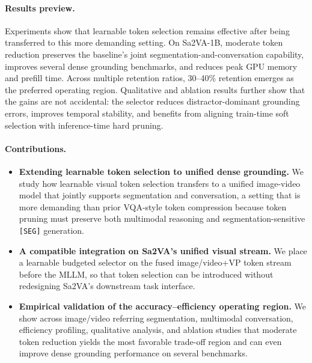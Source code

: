 \paragraph{Results preview.}
Experiments show that learnable token selection remains effective after being transferred to this more demanding setting.
On Sa2VA-1B, moderate token reduction preserves the baseline's joint segmentation-and-conversation capability, improves several dense grounding benchmarks, and reduces peak GPU memory and prefill time.
Across multiple retention ratios, 30--40\% retention emerges as the preferred operating region.
Qualitative and ablation results further show that the gains are not accidental: the selector reduces distractor-dominant grounding errors, improves temporal stability, and benefits from aligning train-time soft selection with inference-time hard pruning.

\paragraph{Contributions.}
\begin{itemize}
    \item \textbf{Extending learnable token selection to unified dense grounding.} We study how learnable visual token selection transfers to a unified image-video model that jointly supports segmentation and conversation, a setting that is more demanding than prior VQA-style token compression because token pruning must preserve both multimodal reasoning and segmentation-sensitive \texttt{[SEG]} generation.
    \item \textbf{A compatible integration on Sa2VA's unified visual stream.} We place a learnable budgeted selector on the fused image/video+VP token stream before the MLLM, so that token selection can be introduced without redesigning Sa2VA's downstream task interface.
    \item \textbf{Empirical validation of the accuracy--efficiency operating region.} We show across image/video referring segmentation, multimodal conversation, efficiency profiling, qualitative analysis, and ablation studies that moderate token reduction yields the most favorable trade-off region and can even improve dense grounding performance on several benchmarks.
\end{itemize}
